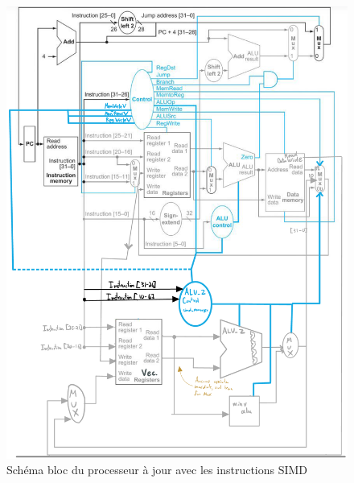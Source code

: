 \documentclass[a11paper]{article}
\begin{document}
\begin{figure}[H]
  \centering
  \includegraphics[width=.7\textwidth]{assets/bloc.jpeg}
  \caption{Schéma bloc du processeur à jour avec les instructions SIMD}
  \label{fig:bloc-diagram}
\end{figure}
\end{document}
